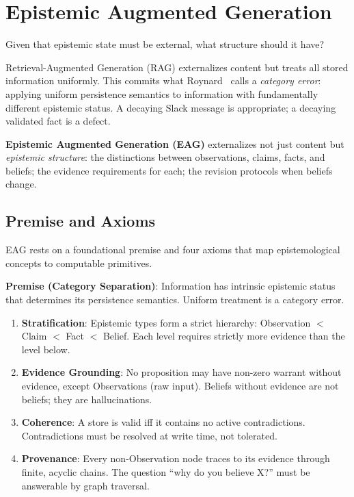 \documentclass[11pt,letterpaper]{article}
\begin{document}
\section{Epistemic Augmented Generation}
\label{sec:eag}

Given that epistemic state must be external, what structure should it have?

Retrieval-Augmented Generation (RAG) externalizes content but treats all stored information uniformly. This commits what Roynard~\cite{roynard2026} calls a \textit{category error}: applying uniform persistence semantics to information with fundamentally different epistemic status. A decaying Slack message is appropriate; a decaying validated fact is a defect.

\textbf{Epistemic Augmented Generation (EAG)} externalizes not just content but \textit{epistemic structure}: the distinctions between observations, claims, facts, and beliefs; the evidence requirements for each; the revision protocols when beliefs change.

\subsection{Premise and Axioms}

EAG rests on a foundational premise and four axioms that map epistemological concepts to computable primitives.

\textbf{Premise (Category Separation)}: Information has intrinsic epistemic status that determines its persistence semantics. Uniform treatment is a category error.

\begin{enumerate}[noitemsep]
    \item[\textbf{A1}] \textbf{Stratification}: Epistemic types form a strict hierarchy: Observation $<$ Claim $<$ Fact $<$ Belief. Each level requires strictly more evidence than the level below.

    \item[\textbf{A2}] \textbf{Evidence Grounding}: No proposition may have non-zero warrant without evidence, except Observations (raw input). Beliefs without evidence are not beliefs; they are hallucinations.

    \item[\textbf{A3}] \textbf{Coherence}: A store is valid iff it contains no active contradictions. Contradictions must be resolved at write time, not tolerated.

    \item[\textbf{A4}] \textbf{Provenance}: Every non-Observation node traces to its evidence through finite, acyclic chains. The question ``why do you believe X?'' must be answerable by graph traversal.
\end{enumerate}
\end{document}
